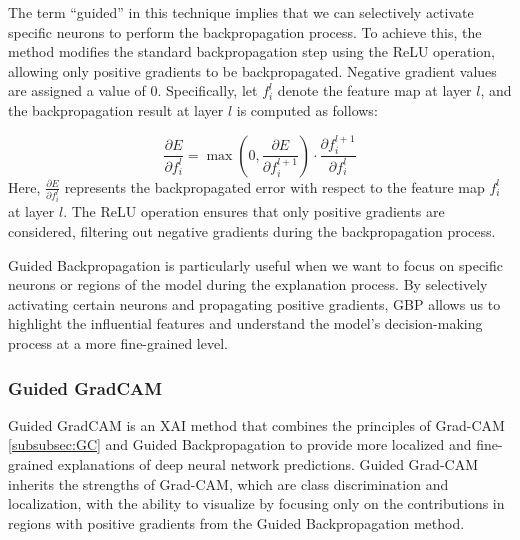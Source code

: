 The term ``guided'' in this technique implies that we can selectively activate specific neurons to perform the backpropagation process. To achieve this, the method modifies the standard backpropagation step using the ReLU operation, allowing only positive gradients to be backpropagated. Negative gradient values are assigned a value of 0. Specifically, let $f^l_i$ denote the feature map at layer $l$, and the backpropagation result at layer $l$ is computed as follows:

\begin{equation}
\frac{\partial E}{\partial f^l_i} = \max\left(0, \frac{\partial E}{\partial f^{l+1}_i}\right) \cdot \frac{\partial f^{l+1}_i}{\partial f^l_i}
\end{equation}
%
Here, $\frac{\partial E}{\partial f^l_i}$ represents the backpropagated error with respect to the feature map $f^l_i$ at layer $l$. The ReLU operation ensures that only positive gradients are considered, filtering out negative gradients during the backpropagation process.

Guided Backpropagation is particularly useful when we want to focus on specific neurons or regions of the model during the explanation process. By selectively activating certain neurons and propagating positive gradients, GBP allows us to highlight the influential features and understand the model's decision-making process at a more fine-grained level.

\subsubsection{Guided GradCAM}
\label{subsubsec: GGCAM}
Guided GradCAM is an XAI method that combines the principles of Grad-CAM \ref{subsubsec:GC} and Guided Backpropagation to provide more localized and fine-grained explanations of deep neural network predictions. Guided Grad-CAM inherits the strengths of Grad-CAM, which are class discrimination and localization, with the ability to visualize by focusing only on the contributions in regions with positive gradients from the Guided Backpropagation method.

